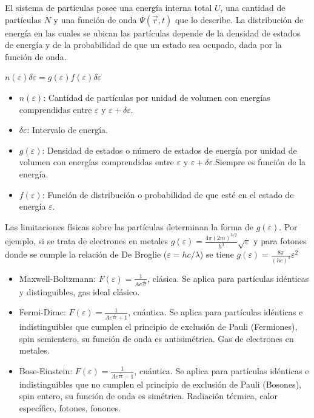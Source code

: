 \documentclass[oneside]{book}
\numberwithin{equation}{section}
\numberwithin{figure}{section}
\numberwithin{table}{section}
\begin{document}
			El sistema de partículas posee una energía interna total $U$, una cantidad de partículas $N$ y una función de onda $\Psi (\vec{r},t)$ que lo describe. La distribución de energía en las cuales se ubican las partículas depende de la densidad de estados de energía y de la probabilidad de que un estado sea ocupado, dada por la función de onda.
			
			\begin{center}
				$\displaystyle n(\varepsilon) \delta\varepsilon=g(\varepsilon)f(\varepsilon)\delta\varepsilon$
			\end{center}

			\begin{itemize}
				\item $n(\varepsilon)$: Cantidad de partículas por unidad de volumen con energías comprendidas entre $\varepsilon$ y $\varepsilon+\delta\varepsilon$.
				\item $\delta\varepsilon$: Intervalo de energía.
				\item $g(\varepsilon)$: Densidad de estados o número de estados de energía por unidad de volumen con energías comprendidas entre  $\varepsilon$ y $\varepsilon+\delta\varepsilon$.Siempre es función de la energía.
				\item $f(\varepsilon)$: Función de distribución o probabilidad de que esté en el estado de energía $\varepsilon$.\\
			\end{itemize}					
			
			Las limitaciones físicas sobre las partículas determinan la forma de $g(\varepsilon)$. Por ejemplo, si se trata de electrones en metales $\displaystyle g(\varepsilon)=\frac{4\pi (2m)^{3/2}}{h^3}\sqrt{\varepsilon}$ y para fotones donde se cumple la relación de De Broglie ($\varepsilon=h c/\lambda$) se tiene $\displaystyle g(\varepsilon)=\frac{8\pi}{(hc)^3}\varepsilon^2$\\
			
			\begin{itemize}
				\item Maxwell-Boltzmann: $\displaystyle F(\varepsilon)=\frac{1}{A e^{\frac{\varepsilon}{kT}}}$, clásica. Se aplica para partículas idénticas y distinguibles, gas ideal clásico.
				\item Fermi-Dirac: $\displaystyle F(\varepsilon)=\frac{1}{A e^{\frac{\varepsilon}{kT}}+1}$, cuántica. Se aplica para partículas idénticas e indistinguibles que cumplen el principio de exclusión de Pauli (Fermiones), spin semientero, su función de onda es antisimétrica. Gas de electrones en metales.
				\item Bose-Einstein: $\displaystyle F(\varepsilon)=\frac{1}{A e^{\frac{\varepsilon}{kT}}-1}$, cuántica. Se aplica para partículas idénticas e indistinguibles que no cumplen el principio de exclusión de Pauli (Bosones), spin entero, su función de onda es simétrica. Radiación térmica, calor específico, fotones, fonones.
			\end{itemize}
			
\end{document}
